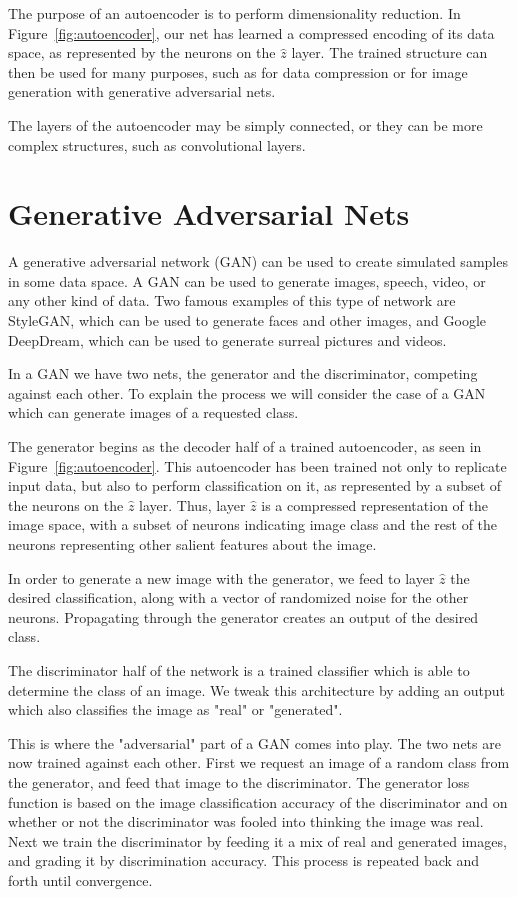 The purpose of an autoencoder is to perform dimensionality reduction. In Figure~\ref{fig:autoencoder}, our net has learned a compressed encoding of its data space, as represented by the neurons on the $\hat{z}$ layer. The trained structure can then be used for many purposes, such as for data compression or for image generation with generative adversarial nets.

The layers of the autoencoder may be simply connected, or they can be more complex structures, such as convolutional layers.

\section{Generative Adversarial Nets}

A generative adversarial network (GAN) can be used to create simulated samples in some data space. A GAN can be used to generate images, speech, video, or any other kind of data. Two famous examples of this type of network are StyleGAN, which can be used to generate faces and other images, and Google DeepDream, which can be used to generate surreal pictures and videos.

In a GAN we have two nets, the generator and the discriminator, competing against each other. To explain the process we will consider the case of a GAN which can generate images of a requested class.

The generator begins as the decoder half of a trained autoencoder, as seen in Figure~\ref{fig:autoencoder}. This autoencoder has been trained not only to replicate input data, but also to perform classification on it, as represented by a subset of the neurons on the $\hat{z}$ layer. Thus, layer $\hat{z}$ is a compressed representation of the image space, with a subset of neurons indicating image class and the rest of the neurons representing other salient features about the image.

In order to generate a new image with the generator, we feed to layer $\hat{z}$ the desired classification, along with a vector of randomized noise for the other neurons. Propagating through the generator creates an output of the desired class.

The discriminator half of the network is a trained classifier which is able to determine the class of an image. We tweak this architecture by adding an output which also classifies the image as "real" or "generated".

This is where the "adversarial" part of a GAN comes into play. The two nets are now trained against each other. First we request an image of a random class from the generator, and feed that image to the discriminator. The generator loss function is based on the image classification accuracy of the discriminator and on whether or not the discriminator was fooled into thinking the image was real. Next we train the discriminator by feeding it a mix of real and generated images, and grading it by discrimination accuracy. This process is repeated back and forth until convergence.

